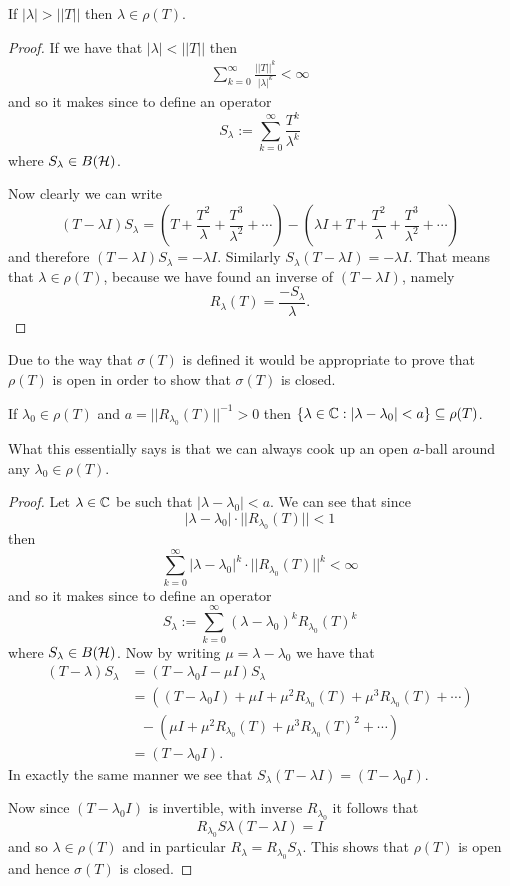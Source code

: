 \documentclass{unswmaths}
\begin{document}
\begin{lemma}
\label{lem:sigma_bdd}
	If $ | \lambda | > ||T|| $ then $ \lambda \in \rho(T) $.
\end{lemma}
\begin{proof}
	If we have that $ | \lambda | < ||T|| $ then 
	\begin{align*}
		\sum_{k=0}^\infty \frac{||T||^k}{|\lambda|^k} < \infty 
	\end{align*}
	and so it makes since to define an operator
	$$
		S_\lambda := \sum_{k=0}^\infty \frac{T^k}{\lambda^k}
	$$
	where  $ S_\lambda \in B(\mathcal{H}) $.
	
	Now clearly we can write
	$$
		(T-\lambda I) S_\lambda = (T + \frac{T^2}{\lambda} + \frac{T^3}{\lambda^2} + \cdots ) - (\lambda I + T + \frac{T^2}{\lambda} + \frac{T^3}{\lambda^2} + \cdots )
	$$
	and therefore $ (T-\lambda I) S_\lambda = - \lambda I $.
	Similarly $ S_\lambda (T-\lambda I) = - \lambda I $.
	That means that $ \lambda \in \rho(T) $, because we have found an inverse of $ (T-\lambda I ) $, namely
	$$ R_\lambda(T) = \frac{-S_\lambda}{\lambda}. $$
\end{proof}

Due to the way that $ \sigma(T) $ is defined it would be appropriate to prove that $ \rho(T) $ is open
in order to show that $ \sigma(T) $ is closed.
\begin{lemma}
\label{lem:sigma_closed}
	If $ \lambda_0 \in \rho(T) $ and $ a = ||R_{\lambda_0}(T)||^{-1} > 0 $ then 
	$ \{ \lambda \in \mathbb{C} : | \lambda - \lambda_0 | < a \} \subseteq \rho(T) $. 
\end{lemma}
What this essentially says is that we can always cook up an open $a$-ball around any $ \lambda_0 \in \rho(T) $.
\begin{proof}
	Let $ \lambda \in \mathbb{C} $ be such that $ |\lambda - \lambda_0 | < a $.
	We can see that since $$ |\lambda - \lambda_0| \cdot || R_{\lambda_0} (T) || < 1 $$ then 
	$$
		\sum_{k=0}^\infty |\lambda - \lambda_0|^k\cdot || R_{\lambda_0}(T) ||^k < \infty
	$$
	and so it makes since to define an operator
	$$
		S_\lambda := \sum_{k=0}^\infty (\lambda -\lambda_0)^k R_{\lambda_0}(T)^{k}
	$$
	where $ S_\lambda \in B(\mathcal{H}) $.
	Now by writing $ \mu = \lambda - \lambda_0 $ we have that
	\begin{align*}
		(T - \lambda)S_\lambda &= (T - \lambda_0 I - \mu I)S_\lambda \\
			&= \left( (T- \lambda_0 I) + \mu I + \mu^2 R_{\lambda_0}(T) + \mu^3R_{\lambda_0}(T) + \cdots \right) \\
			& \ \ \ - \left( \mu I + \mu^2 R_{\lambda_0}(T) + \mu^3 R_{\lambda_0}(T)^2 + \cdots  \right) \\
			&= (T - \lambda_0 I ).
	\end{align*}
	In exactly the same manner we see that $ S_\lambda(T-\lambda I) = (T - \lambda_0 I)$.
	
	Now since $ (T-\lambda_0 I ) $ is invertible, with inverse $ R_{\lambda_0} $ it follows that 
	$$
		R_{\lambda_0}S\lambda (T -\lambda I ) = I
	$$
	and so $ \lambda \in \rho(T) $ and in particular $ R_{\lambda} = R_{\lambda_0}S_{\lambda} $.
	This shows that $ \rho(T) $ is open and hence $ \sigma(T) $ is closed.
\end{proof}
\end{document}
